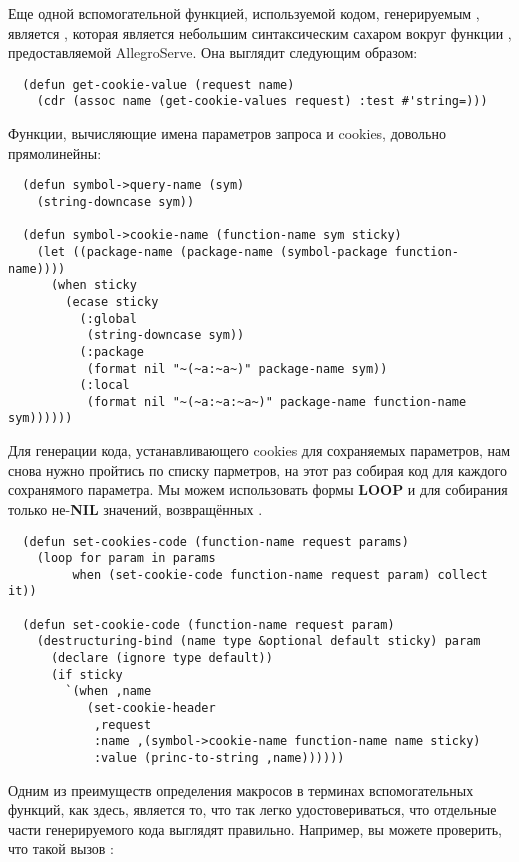 Еще одной вспомогательной функцией, используемой кодом, генерируемым ,
является , которая является небольшим синтаксическим сахаром вокруг
функции , предоставляемой AllegroServe. Она выглядит следующим
образом:

\begin{lstlisting}
  (defun get-cookie-value (request name)
    (cdr (assoc name (get-cookie-values request) :test #'string=)))
\end{lstlisting}

Функции, вычисляющие имена параметров запроса и cookies, довольно прямолинейны:

\begin{lstlisting}
  (defun symbol->query-name (sym)
    (string-downcase sym))

  (defun symbol->cookie-name (function-name sym sticky)
    (let ((package-name (package-name (symbol-package function-name))))
      (when sticky
        (ecase sticky
          (:global
           (string-downcase sym))
          (:package
           (format nil "~(~a:~a~)" package-name sym))
          (:local 
           (format nil "~(~a:~a:~a~)" package-name function-name sym))))))
\end{lstlisting}

Для генерации кода, устанавливающего cookies для сохраняемых параметров, нам снова нужно
пройтись по списку парметров, на этот раз собирая код для каждого сохранямого
параметра. Мы можем использовать формы \textbf{LOOP}  и  для
собирания только не-\textbf{NIL} значений, возвращённых .

\begin{lstlisting}
  (defun set-cookies-code (function-name request params)
    (loop for param in params
         when (set-cookie-code function-name request param) collect it))

  (defun set-cookie-code (function-name request param)
    (destructuring-bind (name type &optional default sticky) param
      (declare (ignore type default))
      (if sticky
        `(when ,name 
           (set-cookie-header 
            ,request
            :name ,(symbol->cookie-name function-name name sticky)
            :value (princ-to-string ,name))))))
\end{lstlisting}

Одним из преимуществ определения макросов в терминах вспомогательных функций, как здесь,
является то, что так легко удостовериваться, что отдельные части генерируемого кода
выглядят правильно. Например, вы можете проверить, что такой вызов :

